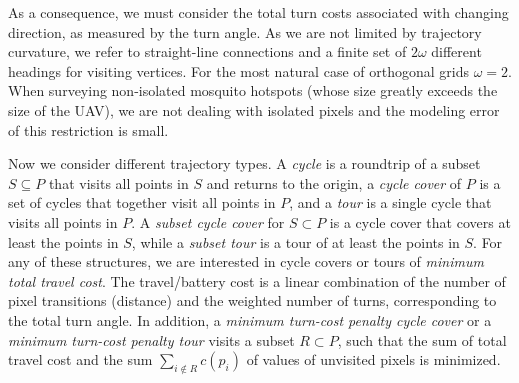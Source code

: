 As a consequence, we must consider the total turn costs associated
with changing direction, as measured by the turn angle.
As we are not limited by trajectory curvature, we refer to straight-line connections and a finite set of $2\omega$ different
headings for visiting vertices. For the most natural case of orthogonal grids $\omega=2$. When
surveying non-isolated mosquito hotspots (whose size greatly exceeds the size of the UAV), we are not dealing with
isolated pixels and the modeling error of this restriction is small.

Now we consider different trajectory types.
A {\em cycle} is a roundtrip of a subset $S\subseteq P$ that visits all points in $S$ and returns to the origin, a {\em cycle cover} of $P$ is a set of cycles
that together visit all points in $P$, and a {\em tour} is a single cycle that visits all points in $P$. A {\em subset cycle cover} for $S\subset P$ is a cycle
cover that covers at least the points in $S$, while a {\em subset tour} is a tour of at least the points in $S$. For any of these structures, we are interested in
{cycle covers or tours of {\em minimum total travel cost}. 
The travel/battery cost is a linear combination of the number of pixel transitions (distance) and the weighted number of turns, 
corresponding to the total turn angle.
}
In addition, a {\em minimum turn-cost penalty cycle cover}  or a {\em minimum turn-cost penalty tour}
visits a subset $R\subset P$, such that the sum of total travel cost and the sum $\sum_{i\not\in R} c(p_i)$ of values of 
unvisited pixels is minimized. 

